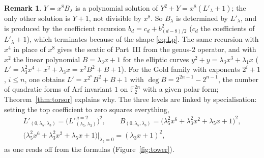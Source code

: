 \documentclass[12pt,a4paper]{amsart}
\theoremstyle{definition}
\newtheorem{remark}[theorem]{Remark}
\newcommand{\F}{\mathbb{F}}
\begin{document}
\begin{remark}\label{rem:AS}
$Y=x^8B_\lambda$ is a polynomial solution of $Y^2+Y=x^8(L'_\lambda+1)$; the only other solution is $Y+1$, not divisible by $x^8$. So $B_\lambda$ is determined by $L'_\lambda$, and is produced by the coefficient recursion $b_d=c_d+b_{(d-8)/2}^2$ ($c_d$ the coefficients of $L'_\lambda+1$), which terminates because of the shape \eqref{eq:Lp}. The same recursion with $x^4$ in place of $x^8$ gives the sextic of Part~III from the genus-$2$ operator, and with $x^2$ the linear polynomial $B=\lambda_3x+1$ for the elliptic curves $y^2+y=\lambda_3x^3+\lambda_1x$ ($L'=\lambda_3^2x^4+x^2+\lambda_3x=x^2B^2+B+1$). For the Gold family with exponents $2^i+1$, $i\le n$, one obtains $L'=x^{2^n}B^2+B+1$ with $\deg B=2^{2n-1}-2^{n-1}$, the number of quadratic forms of Arf invariant $1$ on $\F_2^{2n}$ with a given polar form; Theorem~\ref{thm:torsor} explains why. The three levels are linked by specialisation: setting the top coefficient to zero squares everything,
\begin{gather*}
L'_{(0,\lambda_5,\lambda_3)}=\bigl(L'^{\,g=2}_{(\lambda_5,\lambda_3)}\bigr)^2,\qquad
B_{(0,\lambda_5,\lambda_3)}=\bigl(\lambda_5^2x^6+\lambda_3^2x^2+\lambda_5x+1\bigr)^2,\\
\bigl(\lambda_5^2x^6+\lambda_3^2x^2+\lambda_5x+1\bigr)\big|_{\lambda_5=0}=(\lambda_3x+1)^2,
\end{gather*}
as one reads off from the formulas (Figure~\ref{fig:tower}).
\end{remark}
\end{document}

